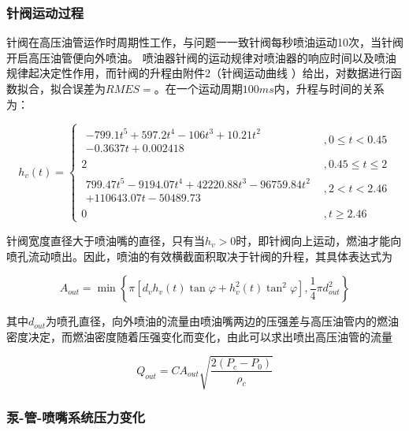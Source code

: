 \documentclass[withoutpreface,bwprint]{cumcmthesis} %
\begin{document}
			
			
			
			\subsubsection{针阀运动过程}
			
			针阀在高压油管运作时周期性工作，与问题一一致针阀每秒喷油运动10次，当针阀开启高压油管便向外喷油。
			喷油器针阀的运动规律对喷油器的响应时间以及喷油规律起决定性作用，而针阀的升程由附件2（针阀运动曲线 ）给出，对数据进行函数拟合，拟合误差为$RMES = $。在一个运动周期$100ms$内，升程与时间的关系为：
			
			\begin{equation}
			h_v(t) = \left\{ \begin{array}{ll} \begin{array}{ll}
			-799.1 t^5 + 597.2 t^4 - 106 t^3 + 10.21 t^2 \\ -  0.3637 t + 0.002418 \end{array} &, 0 \leq t < 0.45 \\
			2 &, 0.45 \leq t \leq 2 \\
			\begin{array}{ll}
			799.47t^5 - 9194.07 t^4 + 42220.88 t^3 - 96759.84 t^2 \\ + 110643.07 t - 50489.73 
			\end{array} &, 2 < t < 2.46 \\
			0 &, t \geq 2.46
			\end{array} \right.
			\end{equation}
			
			针阀宽度直径大于喷油嘴的直径，只有当$h_v > 0$时，即针阀向上运动，燃油才能向喷孔流动喷出。因此，喷油的有效横截面积取决于针阀的升程，其具体表达式为
			
			\begin{equation}A_{out} = \min\left\{ \pi[d_v h_v(t) \tan \varphi + h_v^2(t) \tan^2\varphi ], \frac{1}{4} \pi d_{out}^2 \right\}\end{equation}
			
			其中$d_{out}$为喷孔直径，向外喷油的流量由喷油嘴两边的压强差与高压油管内的燃油密度决定，而燃油密度随着压强变化而变化，由此可以求出喷出高压油管的流量
			
			\begin{equation}Q_{out} = CA_{out} \sqrt{\frac{2(P_c - P_0)}{\rho_c}}\end{equation}
			
			
			
			\subsubsection{泵-管-喷嘴系统压力变化}
			
\end{document}
